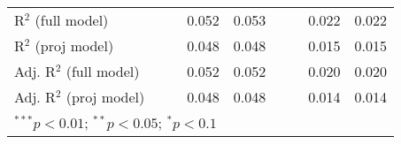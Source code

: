 \begin{sidewaystable}[h]
\begin{center}
{\begin{tabular}{l S[table-format=6.6] S[table-format=6.6] S[table-format=6.6] S[table-format=6.6] S[table-format=5.5] S[table-format=5.6] S[table-format=5.6] S[table-format=5.6]}
R$^2$ (full model)                  &              &              & 0.052        & 0.053        &             &              & 0.022        & 0.022        \\
R$^2$ (proj model)                  &              &              & 0.048        & 0.048        &             &              & 0.015        & 0.015        \\
Adj. R$^2$ (full model)             &              &              & 0.052        & 0.052        &             &              & 0.020        & 0.020        \\
Adj. R$^2$ (proj model)             &              &              & 0.048        & 0.048        &             &              & 0.014        & 0.014        \\
\bottomrule
{}
\end{tabular}}
\label{table:coefficients}
\end{center}
\end{sidewaystable}

